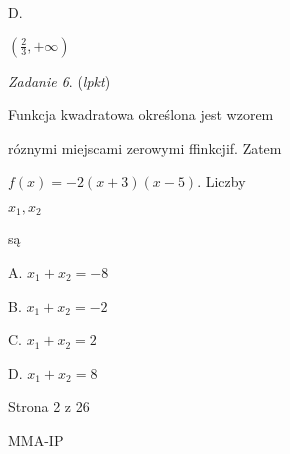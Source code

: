 \documentclass[a4paper,12pt]{article}
\begin{document}
D.

$(\displaystyle \frac{2}{3},+\infty)$

{\it Zadanie 6}. ({\it lpkt})

Funkcja kwadratowa określona jest wzorem

róznymi miejscami zerowymi ffinkcjif. Zatem

$f(x)=-2(x+3)(x-5)$. Liczby

$x_{1}, x_{2}$

są

A. $x_{1}+x_{2}=-8$

B. $x_{1}+x_{2}=-2$

C. $x_{1}+x_{2}=2$

D. $x_{1}+x_{2}=8$

Strona 2 z 26

MMA-IP
\end{document}
